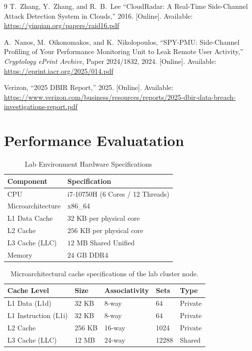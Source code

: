 \documentclass[11pt,a4paper, notitlepage]{article}
\begin{document}
\begin{thebibliography}{9}
T.~Zhang, Y.~Zhang, and R.~B.~Lee 
``CloudRadar: A Real-Time Side-Channel Attack Detection System in Clouds,'' 
2016. [Online]. Available: \url{https://yinqian.org/papers/raid16.pdf}

A.~Nanos, M.~Oikonomakos, and K.~Nikolopoulos, 
``SPY-PMU: Side-Channel Profiling of Your Performance Monitoring Unit to Leak Remote User Activity,'' 
\emph{Cryptology ePrint Archive}, Paper 2024/1832, 2024. [Online]. Available: \url{https://eprint.iacr.org/2025/014.pdf}

Verizon, 
``2025 DBIR Report,'' 
2025. [Online]. Available: \url{https://www.verizon.com/business/resources/reports/2025-dbir-data-breach-investigations-report.pdf}

\end{thebibliography}


\newpage
\appendix
\section{Performance Evaluatation}
\label{appendix:A}


\begin{table}[H]
\centering

\begin{tabular}{l|l}
\textbf{Component} & \textbf{Specification} \\ 
\hline
CPU & i7-10750H (6 Cores / 12 Threads) \\
Microarchitecture & x86\_64 \\
L1 Data Cache & $32\text{ KB}$ per physical core \\
L2 Cache & $256\text{ KB}$ per physical core \\
L3 Cache (LLC) & $12\text{ MB}$ Shared Unified \\
Memory & $24\text{ GB}$ DDR4 \\
\end{tabular}
\caption{\small{Lab Environment Hardware Specifications}}
\label{tab:hardware_specs}
\end{table}


\begin{table}[!htbp]
\centering
\caption{Microarchitectural cache specifications of the lab cluster node.}
\label{tab:cache_specs_grid}
\begin{tabular}{|l|l|l|l|l|}
\hline
\textbf{Cache Level} & \textbf{Size} & \textbf{Associativity} & \textbf{Sets} & \textbf{Type} \\ \hline
L1 Data (L1d)        & 32 KB         & 8-way                  & 64            & Private       \\ \hline
L1 Instruction (L1i) & 32 KB         & 8-way                  & 64            & Private       \\ \hline
L2 Cache             & 256 KB       & 16-way                 & 1024          & Private       \\ \hline
L3 Cache (LLC)       & 12 MB         & 24-way                 & 12288         & Shared        \\ \hline
\end{tabular}
\end{table}
\end{document}
